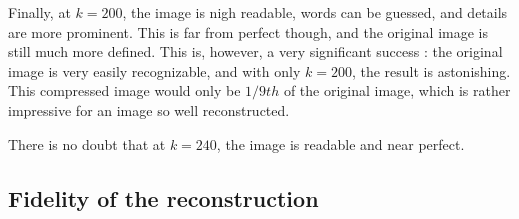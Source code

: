 \documentclass{article}
\begin{document}
    Finally, at $k=200$, the image is nigh readable, words can be guessed, and details are more prominent. This is far from perfect though, and the original image is still much more defined. This is, however, a very significant success : the original image is very easily recognizable, and with only $k = 200$, the result is astonishing.
This compressed image would only be $1/9th$ of the original image, which is rather impressive for an image so well reconstructed.

There is no doubt that at $k=240$, the image is readable and near perfect.

\subsection{Fidelity of the reconstruction}
\end{document}
